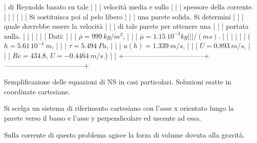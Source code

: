 \documentclass[letterpaper,10pt,italian]{jupyterBook}
\begin{document}
|     di Reynolds basato su tale    |                                   |
|     velocità media e sullo        |                                   |
|     spessore della corrente.      |                                   |
|                                   |                                   |
| Si sostituisca poi al pelo libero |                                   |
| una parete solida. Si determini   |                                   |
| quale dovrebbe essere la velocità |                                   |
| di tale parete per ottenere una   |                                   |
| portata nulla.                    |                                   |
|                                   |                                   |
| Dati:                             |                                   |
| \(\overline{\rho}= 999\ kg/m^3\),   |                                   |
| \(\overline{\mu}= 1.15\ 10^{-3} kg |                                   |
| /(ms)\).                           |                                   |
|                                   |                                   |
| (\(h=5.61\, 10^{-4}\  m\),          |                                   |
| \(\tau = 5.494\ Pa\),               |                                   |
| \(u(h)=1.339\ m/s\),                |                                   |
| \(\overline{U}=0.893\  m/s\),       |                                   |
| \(Re=434.8\), \(U=-0.4464\ m/s\).)    |                                   |
+———————————–+———————————–+

\sphinxAtStartPar
Semplificazione delle equazioni di NS in casi particolari. Soluzioni
esatte in coordinate cartesiane.

\sphinxAtStartPar
Si scelga un sistema di riferimento cartesiano con l’asse x orientato
lungo la parete verso il basso e l’asse y perpendicolare ed uscente ad
essa.

\sphinxAtStartPar
Sulla corrente di questo problema agisce la forza di volume dovuta alla
gravità.
\end{document}
